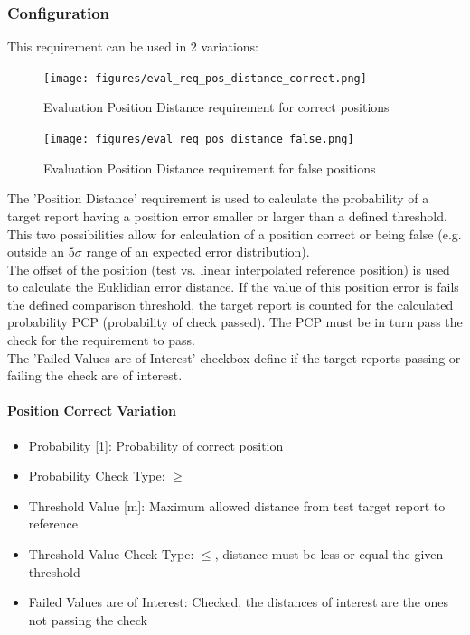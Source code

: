\subsubsection{Configuration}

This requirement can be used in 2 variations:

\begin{figure}[H]
    \texttt{[image: figures/eval\_req\_pos\_distance\_correct.png]}
  \caption{Evaluation Position Distance requirement for correct positions}
\end{figure}

\begin{figure}[H]
    \texttt{[image: figures/eval\_req\_pos\_distance\_false.png]}
  \caption{Evaluation Position Distance requirement for false positions}
\end{figure}

The 'Position Distance' requirement is used to calculate the probability of a target report having a position error smaller or larger than a defined threshold. This two possibilities allow for calculation of a position correct or being false (e.g. outside an $5\sigma$ range of an expected error distribution). \\

The offset of the position (test vs. linear interpolated reference position) is used to calculate the Euklidian error distance. If the  value of this position error is fails the defined comparison threshold, the target report is counted for the calculated probability PCP (probability of check passed). The PCP must be in turn pass the check for the requirement to pass. \\

The 'Failed Values are of Interest' checkbox define if the target reports passing or failing the check are of interest.


\paragraph{Position Correct Variation}

\begin{itemize}  
\item Probability [1]: Probability of correct position
\item Probability Check Type: $\geq$
\item Threshold Value [m]: Maximum allowed distance from test target report to reference
\item Threshold Value Check Type: $\leq$, distance must be less or equal the given threshold
\item Failed Values are of Interest: Checked, the distances of interest are the ones not passing the check
\end{itemize}
\ \\

